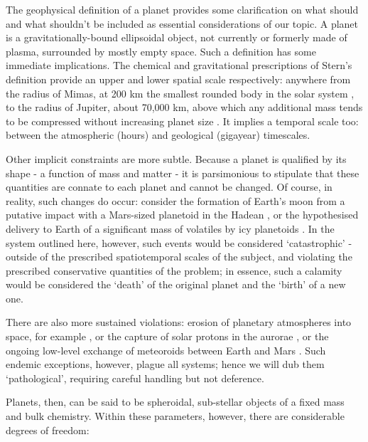 \documentclass[a4paper,11pt,oneside]{book}
\begin{document}
The geophysical definition of a planet provides some clarification on what should and what shouldn't be included as essential considerations of our topic. A planet is a gravitationally-bound ellipsoidal object, not currently or formerly made of plasma, surrounded by mostly empty space. Such a definition has some immediate implications. The chemical and gravitational prescriptions of Stern's definition provide an upper and lower spatial scale respectively: anywhere from the radius of Mimas, at 200 km the smallest rounded body in the solar system \cite{Lodders1998-dj}, to the radius of Jupiter, about 70,000 km, above which any additional mass tends to be compressed without increasing planet size \cite{Basri2006-vw}. It implies a temporal scale too: between the atmospheric (hours) and geological (gigayear) timescales.

Other implicit constraints are more subtle. Because a planet is qualified by its shape - a function of mass and matter - it is parsimonious to stipulate that these quantities are connate to each planet and cannot be changed. Of course, in reality, such changes do occur: consider the formation of Earth's moon from a putative impact with a Mars-sized planetoid in the Hadean \cite{Canup2012-nz}, or the hypothesised delivery to Earth of a significant mass of volatiles by icy planetoids \cite{Owen2000-ze}. In the system outlined here, however, such events would be considered `catastrophic' - outside of the prescribed spatiotemporal scales of the subject, and violating the prescribed conservative quantities of the problem; in essence, such a calamity would be considered the `death' of the original planet and the `birth' of a new one.

There are also more sustained violations: erosion of planetary atmospheres into space, for example \citet{Perez_de_Tejada1992-qq, Kulikov2006-pc}, or the capture of solar protons in the aurorae \cite{Rees1982-vr}, or the ongoing low-level exchange of meteoroids between Earth and Mars \cite{Melosh1993-cb}. Such endemic exceptions, however, plague all systems; hence we will dub them `pathological', requiring careful handling but not deference.

Planets, then, can be said to be spheroidal, sub-stellar objects of a fixed mass and bulk chemistry. Within these parameters, however, there are considerable degrees of freedom:
\end{document}
